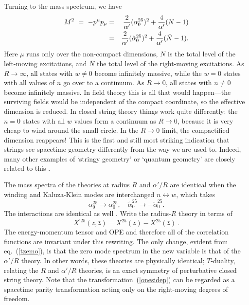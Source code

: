 \documentclass[12pt]{article}
\def\be{\begin{equation}}
\def\ee{\end{equation}}
\def\bea{\begin{eqnarray}}
\def\eea{\end{eqnarray}}
\def\ap{\alpha'}
\newcommand{\zb}{{\bar{z}}}
\begin{document}
Turning to the mass spectrum, we have
\bea
M^2\ =\ -p^\mu p_\mu &=&
{2\over\ap}(\alpha_0^{25})^2+{4\over\ap}
({ N}-1) \nonumber\\
&=& {2\over\ap}({\tilde\alpha}_0^{25})^2+{4\over\ap}
( {\bar N}-1).
\eea
Here $\mu$ runs only over the non-compact dimensions, $N$ is the
total level of the left-moving excitations, and $ \bar N$ the total
level of the right-moving excitations.  As $R \to \infty$, all states with
$w\neq 0$ become infinitely massive, while the $w=0$ states with all
values of $n$ go over to a continuum.  As $R\to 0$, all states with $n
\neq 0$ become infinitely massive.  In field theory this is all that would
happen---the surviving fields would be independent of the compact
coordinate, so the effective dimension is reduced.  In closed string theory
things work quite differently: the $n=0$ states with all $w$ values form a
continuum as $R\to 0$, because it is very cheap to wind around the small
circle.  In the $R\to 0$ limit, the compactified dimension reappears!
This is the first and still most striking indication that strings see
spacetime geometry differently from the way we are used to.  Indeed, many
other examples of `stringy geometry' or `quantum geometry' are closely
related to this \cite{mirror}.

The mass spectra of the theories at radius $R$ and $\ap/ R$ are identical
when the winding and Kaluza-Klein modes are interchanged
$n \leftrightarrow w$, \cite{tdual}
which takes
\be
\alpha^{25}_0 \rightarrow\alpha^{25}_0, \quad
{\tilde\alpha}_0^{25} \rightarrow -{\tilde\alpha}_0^{25} 
\label{tzemo}.
\ee
The interactions are identical as well \cite{nairet}.
Write the radius-$R$
theory in terms of 
\be
X^{\prime25}(z,\zb)=X^{25}(z)-X^{25}(\zb)\ . \label{onesidep}
\ee
The energy-momentum tensor and OPE and therefore all of the correlation
functions are invariant under this rewriting.  The only change, evident
from eq.~(\ref{tzemo}), is that the zero mode spectrum in the new variable
is that of the $\ap/R$ theory.  In other words, these theories are
physically identical; 
$T$-duality, relating the $R$ and $\ap/R$ theories, is an exact
symmetry of perturbative closed string theory.  Note that the
transformation~(\ref{onesidep}) can be regarded as a spacetime parity
transformation acting only on the right-moving degrees of freedom.
\end{document}
